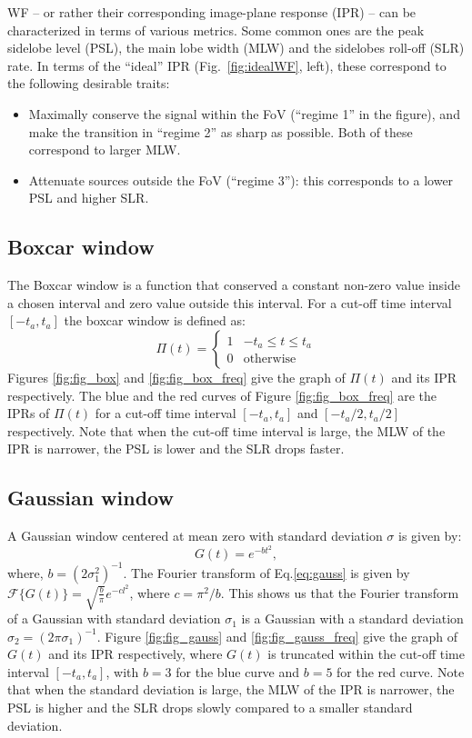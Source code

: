 \documentclass[useAMS,usenatbib]{mn2e}
\begin{document}
WF -- or rather their corresponding image-plane response (IPR) -- can be characterized in terms of various metrics. Some common 
ones are the peak sidelobe level (PSL), the main lobe width (MLW) and the sidelobes roll-off (SLR) rate. In terms of the ``ideal'' 
IPR (Fig.~\ref{fig:idealWF}, left), these correspond to the following desirable traits:

\begin{itemize}
\item Maximally conserve the signal within the FoV (``regime 1'' in the figure), and make the transition in ``regime 2'' as sharp as possible. Both of these correspond to larger MLW.
\item Attenuate sources outside the FoV (``regime 3''): this corresponds to a lower PSL and higher SLR.
\end{itemize}

\subsection{Boxcar window}
The Boxcar window is a function that  conserved a constant non-zero value  inside a chosen  interval and zero value outside this interval. 
For a cut-off time interval  $[-t_a,t_a]$ the boxcar window is defined as:
\begin{equation}
\Pi(t)=\left\{
\begin{array}{rl}
1 & \mbox{$-t_a \leq t \leq t_a$} \\
0 & \mbox{otherwise}
\end{array}\right.
\end{equation}
Figures \ref{fig:fig_box} and \ref{fig:fig_box_freq} give the graph of $\Pi(t)$ and its IPR  respectively. The blue and 
the red curves of Figure \ref{fig:fig_box_freq} are the IPRs of $\Pi(t)$ for a cut-off time interval $[-t_a, t_a]$ and 
$[-t_a/2,t_a/2]$ respectively. Note that when the cut-off time interval is large, the MLW of the IPR is 
narrower, the PSL is lower and the SLR drops faster.
\subsection{Gaussian window}
A Gaussian window centered at mean zero with standard deviation $\sigma$ is given by: 
\begin{equation}
  G(t)= e^{-bt^{2}}, \label{eq:gauss}
\end{equation}
where, $b=(2\sigma_1^2)^{-1}$. The  Fourier transform of Eq.\ref{eq:gauss} is given by 
$\mathcal{F}\big\{G(t)\big\}=\sqrt{\frac{b}{\pi}}e^{-cl^2}$, where $c=\pi^2/b$.
This shows us that the Fourier transform of a Gaussian with standard deviation $\sigma_1$ is a Gaussian with a standard 
deviation $\sigma_2= (2\pi\sigma_1)^{-1}$.
Figure \ref{fig:fig_gauss} and \ref{fig:fig_gauss_freq} give the graph of $G(t)$ and its IPR respectively, where $G(t)$ 
is truncated within the cut-off time interval $[-t_a,t_a]$, with $b = 3$ for the blue curve and $b=5$ for the red curve. Note 
that when the standard deviation is large, the MLW of the IPR is narrower, the PSL is higher and the SLR drops slowly compared to a 
smaller standard deviation.
\end{document}
